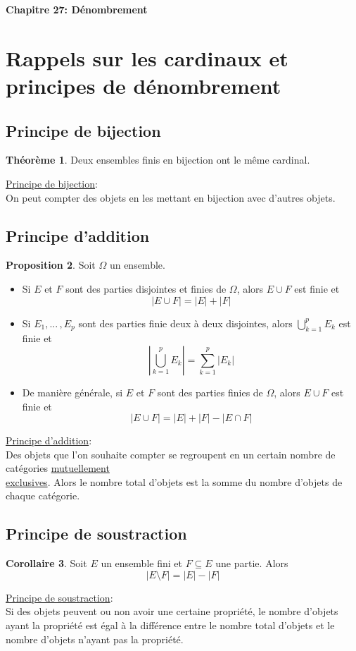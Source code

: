 \documentclass[10pt,a4paper]{article}
\theoremstyle{definition}
\newtheorem{proposition}{Proposition}[section]
\newtheorem{theorem}[proposition]{Théorème}
\newtheorem{corollaire}[proposition]{Corollaire}
\begin{document}
\renewcommand{\labelitemi}{$*$}
\begin{center}
{\Large \textbf{Chapitre 27: Dénombrement}}
\end{center}

\section{Rappels sur les cardinaux et principes de dénombrement}
\subsection{Principe de bijection}
\begin{theorem}
Deux ensembles finis en bijection ont le même cardinal.
\end{theorem}
\noindent \uline{Principe de bijection}: \\
On peut compter des objets en les mettant en bijection avec d'autres objets.

\subsection{Principe d'addition}
\begin{proposition}
Soit $\Omega$ un ensemble.
\begin{itemize}
\item Si $E$ et $F$ sont des parties disjointes et finies de $\Omega$, alors $E \cup F$ est finie et
\[ |E \cup F| = |E| + |F| \]
\item Si $E_1, ...\,, E_p$ sont des parties finie deux à deux disjointes, alors $\bigcup\limits_{k = 1}^p E_k$ est finie et
\[ \left| \bigcup_{k = 1}^p E_k \right| = \sum_{k = 1}^p |E_k| \]
\item De manière générale, si $E$ et $F$ sont des parties finies de $\Omega$, alors $E \cup F$ est finie et
\[ |E \cup F| = |E| + |F| - |E \cap F| \]
\end{itemize}
\end{proposition}
\noindent \uline{Principe d'addition}: \\
Des objets que l'on souhaite compter se regroupent en un certain nombre de catégories \uline{mutuellement} \\ 
\uline{exclusives}. Alors le nombre total d'objets est la somme du nombre d'objets de chaque catégorie.

\subsection{Principe de soustraction}
\begin{corollaire}
Soit $E$ un ensemble fini et $F \subseteq E$ une partie. Alors
\[ |E \setminus F| = |E| - |F| \]
\end{corollaire}
\noindent \uline{Principe de soustraction}: \\
Si des objets peuvent ou non avoir une certaine propriété, le nombre d'objets ayant la propriété est égal à la différence entre le nombre total d'objets et le nombre d'objets n'ayant pas la propriété.
\end{document}
